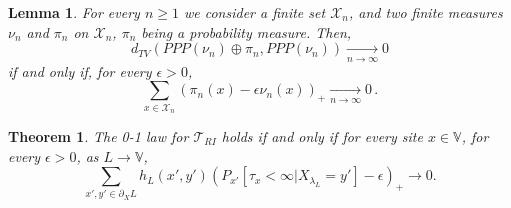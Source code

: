 \documentclass[10pt,a4paper]{amsart}
\newtheorem{theorem}{Theorem}
\newtheorem{lemma}{Lemma}
\begin{document}
\begin{lemma}\label{lem:general_cond_dTVto0_for_PPP}
For every $n\ge 1$ we consider a finite set $\mathcal{X}_n$, and two finite measures $\nu_n$ and $\pi_n$ on $\mathcal{X}_n$, $\pi_n$ being a probability measure. Then, 
\begin{equation}
  d_{TV}(PPP(\nu_n) \oplus \pi_n  , PPP(\nu_n) ) \underset{n\to\infty}{\longrightarrow} 0
\end{equation}
if and only if, for every $\epsilon>0$, 
\begin{equation}
  \sum_{x\in \mathcal{X}_n} 
  \left(\pi_n(x)-\epsilon \nu_n(x)\right)_+  
  \underset{n\to\infty}{\longrightarrow} 0\, .
\end{equation}
\end{lemma}

\begin{theorem}\label{th:quantitative_criterion}
  The 0-1 law for $\mathcal{T}_{RI}$ holds if and only if for every site $x\in \mathbb{V}$, for every $\epsilon>0$, as $L\to \mathbb{V}$,
  \begin{equation}
    \sum_{x', y'\in \partial_X L} h_L(x', y') \left(P_{x'}[\tau_x < \infty | X_{\lambda_L}=y']-\epsilon \right)_+ \to 0.
  \end{equation}
\end{theorem}
\end{document}
